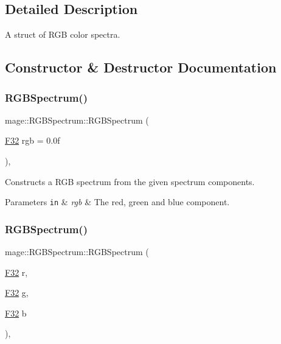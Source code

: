 \subsection{Detailed Description}
A struct of R\+GB color spectra. 

\subsection{Constructor \& Destructor Documentation}
\hypertarget{structmage_1_1_r_g_b_spectrum_a6c740c9f3a7bdee416b374f9be3c589e}{}\label{structmage_1_1_r_g_b_spectrum_a6c740c9f3a7bdee416b374f9be3c589e} 
\subsubsection{\texorpdfstring{R\+G\+B\+Spectrum()}{RGBSpectrum()}\hspace{0.1cm}{\footnotesize\ttfamily [1/7]}}
{\footnotesize\ttfamily mage\+::\+R\+G\+B\+Spectrum\+::\+R\+G\+B\+Spectrum (\begin{DoxyParamCaption}\item[{\hyperlink{namespacemage_aa97e833b45f06d60a0a9c4fc22ae02c0}{F32}}]{rgb = {\ttfamily 0.0f} }\end{DoxyParamCaption})\hspace{0.3cm}{\ttfamily [explicit]}, {\ttfamily [noexcept]}}

Constructs a R\+GB spectrum from the given spectrum components.


\begin{DoxyParams}[1]{Parameters}
\mbox{\tt in}  & {\em rgb} & The red, green and blue component. \\
\hline
\end{DoxyParams}
\hypertarget{structmage_1_1_r_g_b_spectrum_a788773db50b240edae6a23b1c736942d}{}\label{structmage_1_1_r_g_b_spectrum_a788773db50b240edae6a23b1c736942d} 
\subsubsection{\texorpdfstring{R\+G\+B\+Spectrum()}{RGBSpectrum()}\hspace{0.1cm}{\footnotesize\ttfamily [2/7]}}
{\footnotesize\ttfamily mage\+::\+R\+G\+B\+Spectrum\+::\+R\+G\+B\+Spectrum (\begin{DoxyParamCaption}\item[{\hyperlink{namespacemage_aa97e833b45f06d60a0a9c4fc22ae02c0}{F32}}]{r,  }\item[{\hyperlink{namespacemage_aa97e833b45f06d60a0a9c4fc22ae02c0}{F32}}]{g,  }\item[{\hyperlink{namespacemage_aa97e833b45f06d60a0a9c4fc22ae02c0}{F32}}]{b }\end{DoxyParamCaption})\hspace{0.3cm}{\ttfamily [explicit]}, {\ttfamily [noexcept]}}

